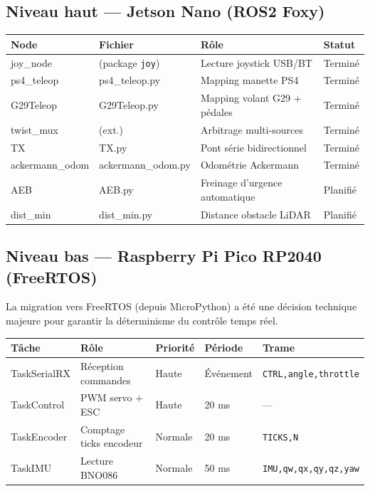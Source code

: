 \documentclass[a4paper,11pt]{article}
\begin{document}
\subsection{Niveau haut — Jetson Nano (ROS2 Foxy)}

\begin{center}
\begin{tabular}{llll}
\toprule
\textbf{Node} & \textbf{Fichier} & \textbf{Rôle} & \textbf{Statut} \\
\midrule
joy\_node & (package \texttt{joy}) & Lecture joystick USB/BT & \textcolor{success}{Terminé} \\
ps4\_teleop & ps4\_teleop.py & Mapping manette PS4 & \textcolor{success}{Terminé} \\
G29Teleop & G29Teleop.py & Mapping volant G29 + pédales & \textcolor{success}{Terminé} \\
twist\_mux & (ext.) & Arbitrage multi-sources & \textcolor{success}{Terminé} \\
TX & TX.py & Pont série bidirectionnel & \textcolor{success}{Terminé} \\
ackermann\_odom & ackermann\_odom.py & Odométrie Ackermann & \textcolor{success}{Terminé} \\
AEB & AEB.py & Freinage d'urgence automatique & \textcolor{warning}{Planifié} \\
dist\_min & dist\_min.py & Distance obstacle LiDAR & \textcolor{warning}{Planifié} \\
\bottomrule
\end{tabular}
\end{center}

\subsection{Niveau bas — Raspberry Pi Pico RP2040 (FreeRTOS)}

La migration vers FreeRTOS (depuis MicroPython) a été une décision technique majeure
pour garantir la déterminisme du contrôle temps réel.

\begin{center}
\begin{tabular}{lllll}
\toprule
\textbf{Tâche} & \textbf{Rôle} & \textbf{Priorité} & \textbf{Période} & \textbf{Trame} \\
\midrule
TaskSerialRX & Réception commandes & Haute & Événement & \texttt{CTRL,angle,throttle} \\
TaskControl  & PWM servo + ESC     & Haute & 20 ms & — \\
TaskEncoder  & Comptage ticks encodeur & Normale & 20 ms & \texttt{TICKS,N} \\
TaskIMU      & Lecture BNO086 & Normale & 50 ms & \texttt{IMU,qw,qx,qy,qz,yaw} \\
\bottomrule
\end{tabular}
\end{center}
\end{document}

